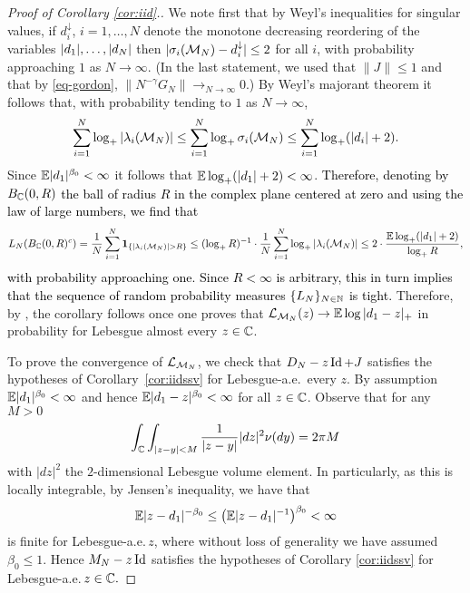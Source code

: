 \documentclass{amsart}
\numberwithin{equation}{section}
\def\corAB{}
\def\corABrev{\textcolor{black}}
\begin{document}
  \begin{proof}[Proof of Corollary \ref{cor:iid}.]
    We note first that by Weyl's inequalities for singular values,
    if $d_i^\downarrow$, $i=1,\ldots,N$ denote the monotone decreasing
    reordering of the
    variables $\corABrev{|d_1|,\ldots,|d_N|}$ then $|\sigma_i(\mathcal{M}_N)-d_i^\downarrow|\leq 2$
    for all $i$, with probability approaching $1$ as $N\to\infty$. (In the last statement, we used that $\|J\|\leq 1$ and
    that by \eqref{eq-gordon},
    $\|N^{-\gamma} G_N\|\to_{N\to\infty} 0$.) By Weyl's majorant theorem
    \cite[Theorem II.3.6]{bhatia} it follows that, with
    probability tending to $1$ as $N\to\infty$,
    $$\sum_{i=1}^N \log_+ |\lambda_i(\mathcal{M}_N)|\leq
    \sum_{i=1}^N \log_+ \sigma_i(\mathcal{M}_N)\leq
    \sum_{i=1}^N \log_+ (|d_i|+2).$$
   Since $\mathbb E |d_1|^{\beta_0} <\infty$ it follows that $\mathbb E\log_+(|d_1|+2)<\infty$. \corABrev{Therefore, denoting by $B_{\mathbb{C}}(0,R)$ the ball of radius $R$ in the complex plane centered at zero and using the law of large numbers, we find that
 \[
 L_N(B_{\mathbb{C}}(0,R)^c) = \frac1N \sum_{i=1}^N {\bf 1}_{\{|\lambda_i(\mathcal{M}_N)  | >R\}} \le (\log _+ R)^{-1} \cdot \frac1N \sum_{i=1}^N \log_+|\lambda_i(\mathcal{M}_N)| \le 2 \cdot \frac{\mathbb E \log_+(|d_1|+2)}{\log_+ R},
   \] 
 with probability approaching one. Since $R <\infty$ is arbitrary, this in turn implies that the sequence of random probability measures $\{L_N\}_{N \in \mathbb N}$ is tight.} Therefore, by
    \cite[Theorem 2.8.3]{tao2012topics}, the corollary follows
    once one proves that
    $\mathcal{L}_{\mathcal{M}_N}(z)\to \mathbb E \log|d_1-z|_+$ in probability for Lebesgue
    almost every
    $z \in \mathbb{C}$.

    To prove the convergence of $\mathcal{L}_{\mathcal{M}_N}$, we check that
    $D_N - z\operatorname{Id} + J$ satisfies the hypotheses of Corollary~\ref{cor:iidssv}
    \corAB{for Lebesgue-a.e.~every $z$}.  By assumption $\mathbb{E} |d_1|^{\beta_0} < \infty$
    and hence $\mathbb{E} |d_1-z|^{\beta_0} < \infty$ for all $z \in \mathbb{C}$.
    Observe that for any $M >0$
    \[
      \int_{\mathbb{C}} \int_{|z-y| < M} \frac{1}{|z-y|} |dz|^2\nu(dy)
      = 2\pi M
    \]
    with $|dz|^2$ the $2$-dimensional Lebesgue volume element.
    In particularly, as this is locally integrable, \corAB{by Jensen's inequality,} we have that
    \[
   \corAB{  \E |z- d_1|^{-\beta_0} \le \left( \Exp |z-d_1|^{-1} \right)^{\beta_0}}< \infty
    \]
    is finite for Lebesgue-a.e.\,$z$, \corAB{where without loss of generality we have assumed $\beta_0 \le 1$}. Hence $M_N-z\operatorname{Id}$ satisfies the hypotheses of Corollary \ref{cor:iidssv} for Lebesgue-a.e.\,$z \in \mathbb{C}.$


\end{proof}
\end{document}
